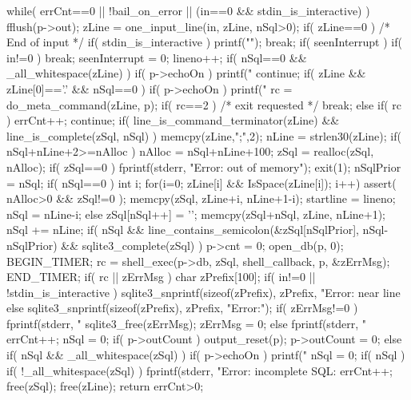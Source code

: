 \begin{Codex}[label=shell.c,numbers=left]
{  while( errCnt==0 || !bail_on_error || (in==0 && stdin_is_interactive) ){
    fflush(p->out);
    zLine = one_input_line(in, zLine, nSql>0);
    if( zLine==0 ){
      /* End of input */
      if( stdin_is_interactive ) printf("\n");
      break;
    }
    if( seenInterrupt ){
      if( in!=0 ) break;
      seenInterrupt = 0;
    }
    lineno++;
    if( nSql==0 && _all_whitespace(zLine) ){
      if( p->echoOn ) printf("%
      continue;
    }
    if( zLine && zLine[0]=='.' && nSql==0 ){
      if( p->echoOn ) printf("%
      rc = do_meta_command(zLine, p);
      if( rc==2 ){ /* exit requested */
        break;
      }else if( rc ){
        errCnt++;
      }
      continue;
    }
    if( line_is_command_terminator(zLine) && line_is_complete(zSql, nSql) ){
      memcpy(zLine,";",2);
    }
    nLine = strlen30(zLine);
    if( nSql+nLine+2>=nAlloc ){
      nAlloc = nSql+nLine+100;
      zSql = realloc(zSql, nAlloc);
      if( zSql==0 ){
        fprintf(stderr, "Error: out of memory\n");
        exit(1);
      }
    }
    nSqlPrior = nSql;
    if( nSql==0 ){
      int i;
      for(i=0; zLine[i] && IsSpace(zLine[i]); i++){}
      assert( nAlloc>0 && zSql!=0 );
      memcpy(zSql, zLine+i, nLine+1-i);
      startline = lineno;
      nSql = nLine-i;
    }else{
      zSql[nSql++] = '\n';
      memcpy(zSql+nSql, zLine, nLine+1);
      nSql += nLine;
    }
    if( nSql && line_contains_semicolon(&zSql[nSqlPrior], nSql-nSqlPrior)
                && sqlite3_complete(zSql) ){
      p->cnt = 0;
      open_db(p, 0);
      BEGIN_TIMER;
      rc = shell_exec(p->db, zSql, shell_callback, p, &zErrMsg);
      END_TIMER;
      if( rc || zErrMsg ){
        char zPrefix[100];
        if( in!=0 || !stdin_is_interactive ){
          sqlite3_snprintf(sizeof(zPrefix), zPrefix, 
                           "Error: near line %
        }else{
          sqlite3_snprintf(sizeof(zPrefix), zPrefix, "Error:");
        }
        if( zErrMsg!=0 ){
          fprintf(stderr, "%
          sqlite3_free(zErrMsg);
          zErrMsg = 0;
        }else{
          fprintf(stderr, "%
        }
        errCnt++;
      }
      nSql = 0;
      if( p->outCount ){
        output_reset(p);
        p->outCount = 0;
      }
    }else if( nSql && _all_whitespace(zSql) ){
      if( p->echoOn ) printf("%
      nSql = 0;
    }
  }
  if( nSql ){
    if( !_all_whitespace(zSql) ){
      fprintf(stderr, "Error: incomplete SQL: %
      errCnt++;
    }
    free(zSql);
  }
  free(zLine);
  return errCnt>0;
}


\end{Codex}
